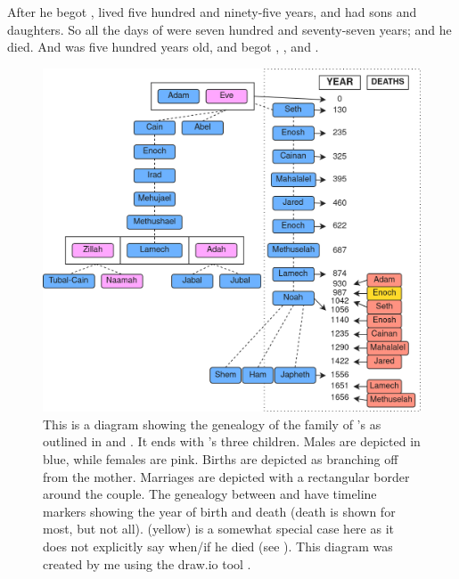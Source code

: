 \bverse After he begot ,  lived five hundred and ninety-five years, and had sons and daughters.
\bverse So all the days of  were seven hundred and seventy-seven years; and he died.
\bverse And  was five hundred years old, and  begot , , and .




\begin{figure}[htbp] %
  \centering
  \includegraphics[width=\linewidth]{images/genealogies/adams_genealogy.png}
  \caption{This is a diagram showing the genealogy of the family of 's as outlined in  and . It ends with 's three children. Males are depicted in blue, while females are pink. Births are depicted as branching off from the mother. Marriages are depicted with a rectangular border around the couple. The genealogy between  and  have timeline markers showing the year of birth and death (death is shown for most, but not all).  (yellow) is a somewhat special case here as it does not explicitly say when/if he died (see ). This diagram was created by me using the draw.io tool \cite{draw.io}.}
  \label{fig:adams_genealogy}
\end{figure}